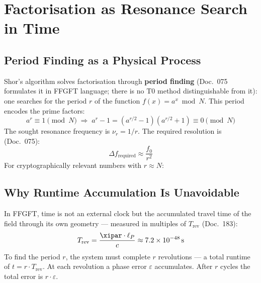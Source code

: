 \section{Factorisation as Resonance Search in Time}

\subsection{Period Finding as a Physical Process}

Shor's algorithm solves factorisation through \textbf{period finding}
(Doc.~075 formulates it in FFGFT language; there is no T0 method
distinguishable from it): one searches for the period $r$ of the function
$f(x) = a^x \bmod N$. This period encodes the prime factors:
\begin{equation}
    a^r \equiv 1 \pmod{N}
    \;\Rightarrow\;
    a^r - 1 = (a^{r/2} - 1)(a^{r/2} + 1) \equiv 0 \pmod{N}
\end{equation}
The sought resonance frequency is $\nu_r = 1/r$. The required resolution is
(Doc.~075):
\begin{equation}
    \Delta f_\text{required} \approx \frac{f_0}{r^2}
\end{equation}
For cryptographically relevant numbers with $r \approx N$:

\begin{table}[ht]
\centering
{}
\caption{Precision barrier for factorisation (after Doc.~075)}
\end{table}

\subsection{Why Runtime Accumulation Is Unavoidable}

In FFGFT, time is not an external clock but the accumulated travel time of the
field through its own geometry — measured in multiples of $T_\text{rev}$ (Doc.~183):
\begin{equation}
    T_\text{rev} = \frac{\xipar \cdot \ell_P}{c} \approx 7.2 \times 10^{-48}\,\text{s}
\end{equation}
To find the period $r$, the system must complete $r$ revolutions — a total runtime
of $t = r \cdot T_\text{rev}$. At each revolution a phase error $\varepsilon$
accumulates. After $r$ cycles the total error is $r \cdot \varepsilon$.

